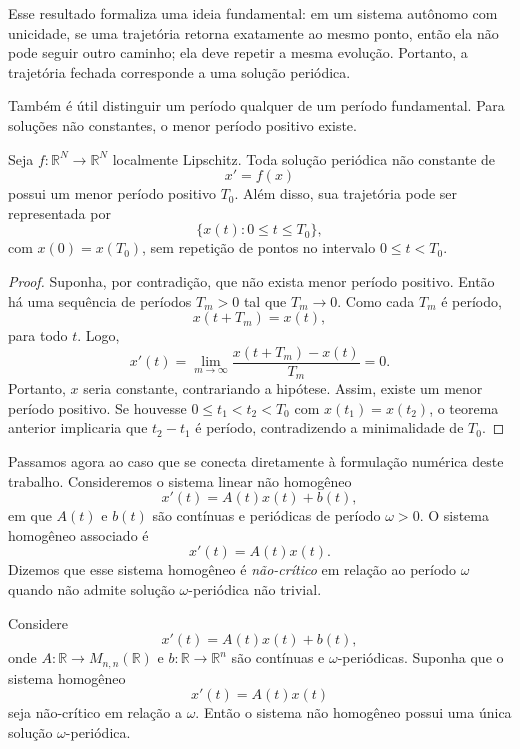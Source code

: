 Esse resultado formaliza uma ideia fundamental: em um sistema autônomo com unicidade, se uma trajetória retorna exatamente ao mesmo ponto, então ela não pode seguir outro caminho; ela deve repetir a mesma evolução. Portanto, a trajetória fechada corresponde a uma solução periódica.

Também é útil distinguir um período qualquer de um período fundamental. Para soluções não constantes, o menor período positivo existe.

\begin{teorema}
Seja \(f:\mathbb{R}^N\to\mathbb{R}^N\) localmente Lipschitz. Toda solução periódica não constante de
\[
x'=f(x)
\]
possui um menor período positivo \(T_0\). Além disso, sua trajetória pode ser representada por
\[
\{x(t):0\leq t\leq T_0\},
\]
com \(x(0)=x(T_0)\), sem repetição de pontos no intervalo \(0\leq t<T_0\).
\end{teorema}

\begin{proof}
Suponha, por contradição, que não exista menor período positivo. Então há uma sequência de períodos \(T_m>0\) tal que \(T_m\to0\). Como cada \(T_m\) é período,
\[
x(t+T_m)=x(t),
\]
para todo \(t\). Logo,
\[
x'(t)=\lim_{m\to\infty}\frac{x(t+T_m)-x(t)}{T_m}=0.
\]
Portanto, \(x\) seria constante, contrariando a hipótese. Assim, existe um menor período positivo. Se houvesse \(0\leq t_1<t_2<T_0\) com \(x(t_1)=x(t_2)\), o teorema anterior implicaria que \(t_2-t_1\) é período, contradizendo a minimalidade de \(T_0\).
\end{proof}

Passamos agora ao caso que se conecta diretamente à formulação numérica deste trabalho. Consideremos o sistema linear não homogêneo
\[
x'(t)=A(t)x(t)+b(t),
\]
em que \(A(t)\) e \(b(t)\) são contínuas e periódicas de período \(\omega>0\). O sistema homogêneo associado é
\[
x'(t)=A(t)x(t).
\]
Dizemos que esse sistema homogêneo é \emph{não-crítico} em relação ao período \(\omega\) quando não admite solução \(\omega\)-periódica não trivial.

\begin{teorema}
Considere
\[
x'(t)=A(t)x(t)+b(t),
\]
onde \(A:\mathbb{R}\to M_{n,n}(\mathbb{R})\) e \(b:\mathbb{R}\to\mathbb{R}^n\) são contínuas e \(\omega\)-periódicas. Suponha que o sistema homogêneo
\[
x'(t)=A(t)x(t)
\]
seja não-crítico em relação a \(\omega\). Então o sistema não homogêneo possui uma única solução \(\omega\)-periódica.
\end{teorema}

